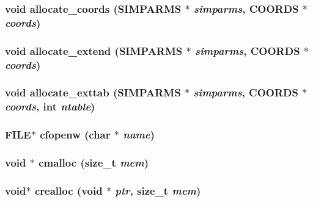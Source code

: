 \subsubsection{\setlength{\rightskip}{0pt plus 5cm}void allocate\_\-coords ({\bf SIMPARMS} $\ast$ {\em simparms}, {\bf COORDS} $\ast$ {\em coords})}\label{md__util_8c_93ebcc5eb181eb7ff6725dffcecf0f83}


\subsubsection{\setlength{\rightskip}{0pt plus 5cm}void allocate\_\-extend ({\bf SIMPARMS} $\ast$ {\em simparms}, {\bf COORDS} $\ast$ {\em coords})}\label{md__util_8c_5ad7b39ff9bb32493b43bc3a76bea3d5}


\subsubsection{\setlength{\rightskip}{0pt plus 5cm}void allocate\_\-exttab ({\bf SIMPARMS} $\ast$ {\em simparms}, {\bf COORDS} $\ast$ {\em coords}, int {\em ntable})}\label{md__util_8c_a92b3b51f009836567801c624886cfd2}


\subsubsection{\setlength{\rightskip}{0pt plus 5cm}FILE$\ast$ cfopenw (char $\ast$ {\em name})}\label{md__util_8c_6dd8c8e7be7ee70a07e47ab5940f6f44}


\subsubsection{\setlength{\rightskip}{0pt plus 5cm}void $\ast$ cmalloc (size\_\-t {\em mem})}\label{md__util_8c_a5c3f1d97e43a7c3bb8e219daa2c6e5f}


\subsubsection{\setlength{\rightskip}{0pt plus 5cm}void$\ast$ crealloc (void $\ast$ {\em ptr}, size\_\-t {\em mem})}\label{md__util_8c_a6dd3d6ff2bb384cf8edd1388d645568}


